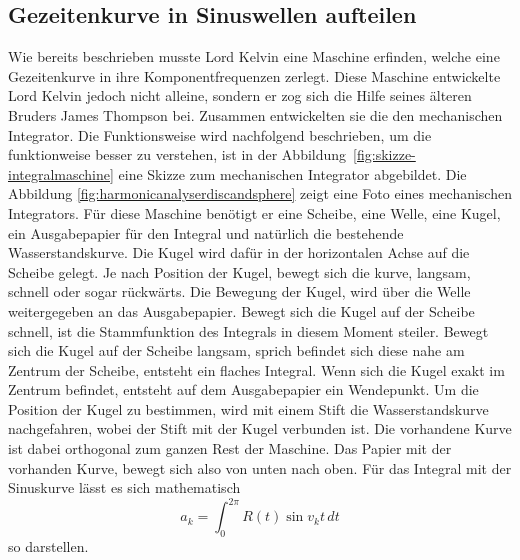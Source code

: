 \subsection{Gezeitenkurve in Sinuswellen aufteilen
	\label{gezeiten:subsection:malorum}}
Wie bereits beschrieben musste Lord Kelvin eine Maschine erfinden, welche eine Gezeitenkurve in ihre Komponentfrequenzen zerlegt.
Diese Maschine entwickelte Lord Kelvin jedoch nicht alleine, sondern er zog sich die Hilfe seines älteren Bruders James Thompson bei.
Zusammen entwickelten sie die den mechanischen Integrator.
Die Funktionsweise wird nachfolgend beschrieben, um die funktionweise
besser zu verstehen, ist in der Abbildung~\ref{fig:skizze-integralmaschine}
eine Skizze zum mechanischen Integrator
abgebildet.
Die Abbildung \ref{fig:harmonicanalyserdiscandsphere} zeigt eine Foto eines mechanischen Integrators.
Für diese Maschine benötigt er eine Scheibe, eine Welle, eine Kugel, ein Ausgabepapier für den Integral und natürlich die bestehende Wasserstandskurve.
Die Kugel wird dafür in der horizontalen Achse auf die Scheibe gelegt.
Je nach Position der Kugel, bewegt sich die kurve, langsam, schnell oder sogar rückwärts.
Die Bewegung der Kugel, wird über die Welle weitergegeben an das Ausgabepapier.
Bewegt sich die Kugel auf der Scheibe schnell, ist die Stammfunktion des Integrals in diesem Moment steiler.
Bewegt sich die Kugel auf der Scheibe langsam, sprich befindet sich diese nahe am Zentrum der Scheibe, entsteht ein flaches Integral.
Wenn sich die Kugel exakt im Zentrum befindet, entsteht auf dem Ausgabepapier ein Wendepunkt.
Um die Position der Kugel zu bestimmen, wird mit einem Stift die Wasserstandskurve nachgefahren, wobei der Stift mit der Kugel verbunden ist.
Die vorhandene Kurve ist dabei orthogonal zum ganzen Rest der Maschine.
Das Papier mit der vorhanden Kurve, bewegt sich also von unten nach oben.
Für das Integral mit der Sinuskurve lässt es sich mathematisch \[
a_k
=  
\int_0^{2\pi} R(t) \sin v_kt \, dt
\]
so darstellen.


